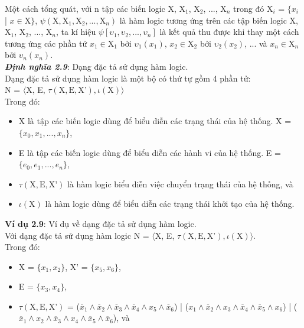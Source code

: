 \documentclass[a4paper,13pt,oneside,openany]{book}
\begin{document}
\begin{flushleft}
		Một cách tổng quát, với n tập các biến logic X, $\textrm{X}_1$, $\textrm{X}_2$, ..., $\textrm{X}_n$ trong đó $\textrm{X}_i$ = $\{x_i$ | $x \in \textrm{X}\}$, $\psi(\textrm{X}, \textrm{X}_1, \textrm{X}_2, ..., \textrm{X}_n)$ là hàm logic tương ứng trên các tập biến logic X, $\textrm{X}_1$, $\textrm{X}_2$, ..., $\textrm{X}_n$, ta kí hiệu $\psi[\upsilon_1, \upsilon_2, ..., \upsilon_n]$ là kết quả thu được khi thay một cách tương ứng các phần tử $x_1 \in \textrm{X}_1$ bởi $\upsilon_1(x_1)$, $x_2 \in \textrm{X}_2$ bởi $\upsilon_2(x_2)$, ... và $x_n \in \textrm{X}_n$ bởi $\upsilon_n(x_n)$.\\
		\textbf{\textit{Định nghĩa 2.9}}: Dạng đặc tả sử dụng hàm logic.\\
		Dạng đặc tả sử dụng hàm logic là một bộ có thứ tự gồm 4 phần tử:\\
		N = $\langle$X, E, $\tau(\textrm{X}, \textrm{E}, \textrm{X'}), \iota(\textrm{X})\rangle$\\
		Trong đó:
		\begin{itemize}
			\item X là tập các biến logic dùng để biểu diễn các trạng thái của hệ thống. X = $\{x_0, x_1, ..., x_n\}$,
			\item E là tập các biến logic dùng để biểu diễn các hành vi của hệ thống. E = $\{e_0, e_1, ..., e_n\}$,
			\item $\tau(\textrm{X}, \textrm{E}, \textrm{X'})$ là hàm logic biểu diễn việc chuyển trạng thái của hệ thống, và
			\item $\iota(\textrm{X})$ là hàm logic dùng để biểu diễn các trạng thái khởi tạo của hệ thống.
		\end{itemize}
		\textbf{Ví dụ 2.9}: Ví dụ về dạng đặc tả sử dụng hàm logic.\\
		Với dạng đặc tả sử dụng hàm logic N = $\langle$X, E, $\tau(\textrm{X}, \textrm{E}, \textrm{X'}), \iota(\textrm{X})\rangle$.\\
		Trong đó:
		\begin{itemize}
			\item X = $\{x_1, x_2\}$, X' = $\{x_5, x_6\}$,
			\item E = $\{x_3, x_4\}$,
			\item $\tau(\textrm{X}, \textrm{E}, \textrm{X'})$ = ($\overline{x}_1 \land \overline{x}_2 \land \overline{x}_3 \land \overline{x}_4 \land x_5 \land \overline{x}_6$) | ($x_1\land\overline{x}_2\land x_3\land \overline{x}_4\land \overline{x}_5 \land x_6$) |
			($\overline{x}_1\land x_2\land\overline{x}_3\land x_4\land \overline{x}_5\land\overline{x}_6$), và

\end{itemize}
\end{flushleft}
\end{document}
